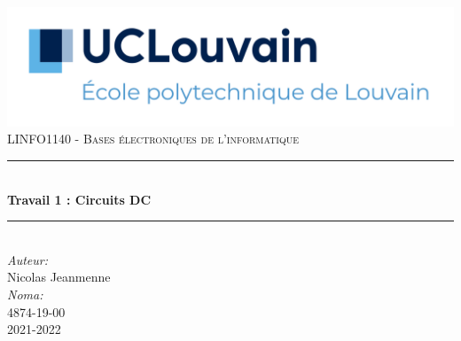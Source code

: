 \begin{titlepage}

    \newcommand{\HRule}{\rule{\linewidth}{0.5mm}} 							%
    \center 
     
    \includegraphics[width=\textwidth]{../pictures/UCLouvain-EPL.png}\\[1cm]
    
    \textsc{\large 
    LINFO1140 - Bases électroniques de l'informatique}\\[1cm] 										%
    \HRule \\[0.8cm]
    { \huge \bfseries Travail 1 : Circuits DC}\\[0.7cm]								%
    \HRule \\[2cm]
    \large
    \emph{Auteur:}\\
    Nicolas Jeanmenne\\[1.5cm]
    \emph{Noma:}\\
    4874-19-00\\[1.5cm]
    \vfill													%
    {\large 2021-2022}\\[5cm] 	%
    
    \vfill
    \end{titlepage}